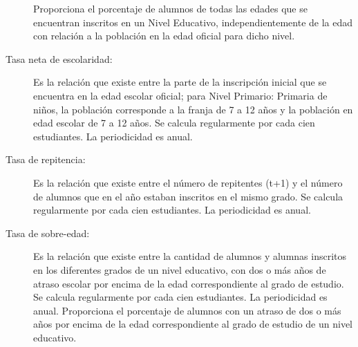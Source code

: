 \begin{description}
Proporciona el porcentaje de alumnos de todas las edades que se encuentran inscritos en un Nivel Educativo, independientemente de la edad con relación a la población en la edad oficial para dicho nivel.
\item[Tasa neta de escolaridad:  ] Es la relación que existe entre la parte de la inscripción inicial que se encuentra en la edad escolar oficial; para Nivel Primario: Primaria de niños, la población corresponde a la franja de 7 a 12 años y la población en edad escolar de 7 a 12 años. Se calcula regularmente por cada cien estudiantes. La periodicidad es anual.
\item[Tasa de repitencia:  ] Es la relación que existe entre el número de repitentes (t+1) y el número de alumnos que en el año  estaban inscritos en el mismo grado. Se calcula regularmente por cada cien estudiantes. La periodicidad es anual.
\item[Tasa de sobre-edad:  ] Es la relación que existe entre la cantidad de alumnos y alumnas inscritos en los diferentes grados de un nivel educativo, con dos o más años de atraso escolar por encima de la edad correspondiente al grado de estudio. Se calcula regularmente por cada cien estudiantes. La periodicidad es anual. Proporciona el porcentaje de alumnos con un atraso de dos o más años por encima de la edad correspondiente al grado de estudio de un nivel educativo.

\end{description}